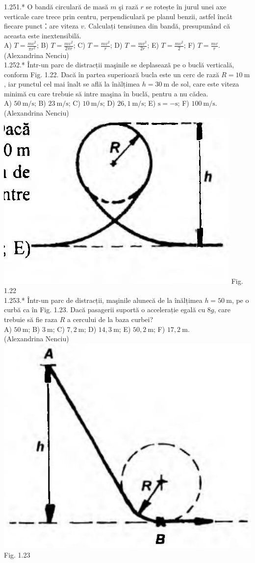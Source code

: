 1.251.* O bandă circulară de masă $m$ şi rază $r$ se rotește în jurul unei axe verticale care trece prin centru, perpendiculară pe planul benzii, astfel încât fiecare punct：are viteza $v$. Calculați tensiunea din bandă, presupunând că aceasta este inextensibilă.\\ A) $T=\frac{m v^{2}}{\pi r^{2}}$; B) $T=\frac{m v^{2}}{2 \pi r}$; C) $T=\frac{m v^{2}}{r}$; D) $T=\frac{m v^{2}}{2 r}$; E) $T=\frac{m v^{2}}{2}$; F) $T=\frac{m v}{r}$.\\ (Alexandrina Nenciu)\\

1.252.* Într-un parc de distracții maşinile se deplaseazã pe o buclă verticală, conform Fig. 1.22. Dacă în partea superioară bucla este un cerc de rază $R=10 \mathrm{~m}$, iar punctul cel mai înalt se află la înălțimea $h=30 \mathrm{~m}$ de sol, care este viteza minimă cu care trebuie să intre maşina în buclă, pentru a nu cădea.\\ A) $50 \mathrm{~m} / \mathrm{s}$; B) $23 \mathrm{~m} / \mathrm{s}$; C) $10 \mathrm{~m} / \mathrm{s}$; D) $26,1 \mathrm{~m} / \mathrm{s}$; E) $\mathrm{s}=-\mathrm{s}$; F) $100 \mathrm{~m} / \mathrm{s}$.\\ (Alexandrina Nenciu)\\ \includegraphics[width=0.4\linewidth]{images/2025_07_01_5b3ff9fa0d508c8e9f17g-057(2)} Fig. 1.22\\

1.253.* Într-un parc de distracții, maşinile alunecă de la înălțimea $h=50 \mathrm{~m}$, pe o curbă ca în Fig. 1.23. Dacă pasagerii suportă o accelerație egală cu $8 g$, care trebuie să fie raza $R$ a cercului de la baza curbei?\\ A) $50 \mathrm{~m}$; B) $3 \mathrm{~m}$; C) $7,2 \mathrm{~m}$; D) $14,3 \mathrm{~m}$; E) $50,2 \mathrm{~m}$; F) $17,2 \mathrm{~m}$.\\ (Alexandrina Nenciu)\\ \includegraphics[width=0.4\linewidth]{images/2025_07_01_5b3ff9fa0d508c8e9f17g-058(1)} Fig. 1.23\\

